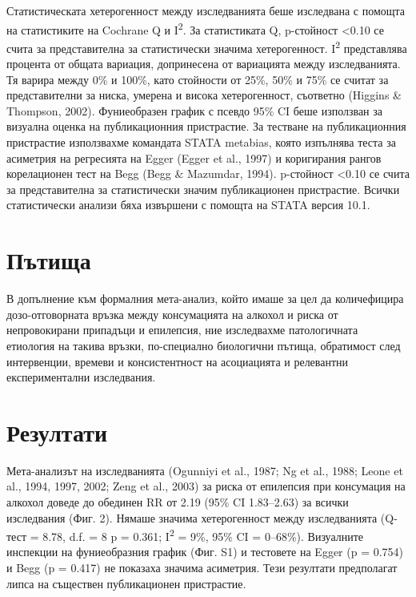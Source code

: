 \documentclass{article}
\begin{document}
Статистическата хетерогенност между изследванията беше изследвана с помощта на статистиките на Cochrane Q и I\textsuperscript{2}. За статистиката Q, p-стойност <0.10 се счита за представителна за статистически значима хетерогенност. I\textsuperscript{2} представлява процента от общата вариация, допринесена от вариацията между изследванията. Тя варира между 0\% и 100\%, като стойности от 25\%, 50\% и 75\% се считат за представителни за ниска, умерена и висока хетерогенност, съответно (Higgins \& Thompson, 2002). Фуниеобразен график с псевдо 95\% CI беше използван за визуална оценка на публикационния пристрастие. За тестване на публикационния пристрастие използвахме командата STATA metabias, която изпълнява теста за асиметрия на регресията на Egger (Egger et al., 1997) и коригирания рангов корелационен тест на Begg (Begg \& Mazumdar, 1994). p-стойност <0.10 се счита за представителна за статистически значим публикационен пристрастие. Всички статистически анализи бяха извършени с помощта на STATA версия 10.1.

\section{Пътища}

В допълнение към формалния мета-анализ, който имаше за цел да количефицира дозо-отговорната връзка между консумацията на алкохол и риска от непровокирани припадъци и епилепсия, ние изследвахме патологичната етиология на такива връзки, по-специално биологични пътища, обратимост след интервенции, времеви и консистентност на асоциацията и релевантни експериментални изследвания.

\section{Резултати}

Мета-анализът на изследванията (Ogunniyi et al., 1987; Ng et al., 1988; Leone et al., 1994, 1997, 2002; Zeng et al., 2003) за риска от епилепсия при консумация на алкохол доведе до обединен RR от 2.19 (95\% CI 1.83–2.63) за всички изследвания (Фиг. 2). Нямаше значима хетерогенност между изследванията (Q-тест = 8.78, d.f. = 8 p = 0.361; I\textsuperscript{2} = 9\%, 95\% CI = 0–68\%). Визуалните инспекции на фуниеобразния график (Фиг. S1) и тестовете на Egger (p = 0.754) и Begg (p = 0.417) не показаха значима асиметрия. Тези резултати предполагат липса на съществен публикационен пристрастие.
\end{document}
